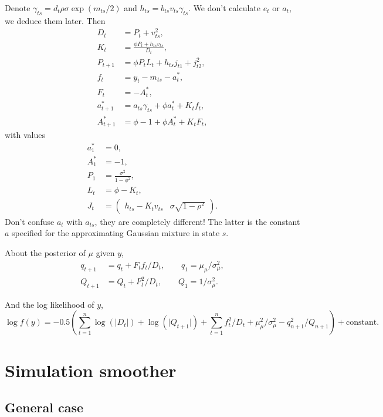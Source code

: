 \documentclass{article}
\begin{document}
Denote $\gamma_{ts}=d_t\rho\sigma\exp(m_{ts}/2)$ and $h_{ts}=b_{ts}v_{ts}\gamma_{ts}$. We don't calculate $e_t$ or $a_t$, we deduce them later. Then
\begin{align*}
D_t & = P_t+v_{ts}^2, \\
K_t & = \frac{\phi P_t+h_{ts}v_{ts}}{D_t}, \\
P_{t+1} & = \phi P_tL_t+h_{ts}j_{t1} + j_{t2}^2, \\
f_t & = y_t - m_{ts} - a_t^*, \\
F_t & = -A_t^*, \\
a_{t+1}^* & = a_{ts}\gamma_{ts}+\phi a_t^* + K_tf_t, \\
A_{t+1}^* & = \phi-1+\phi A_t^*+K_tF_t,
\end{align*}
with values
\begin{align*}
a_1^* & = 0, \\
A_1^* & = -1, \\
P_1 & = \frac{\sigma^2}{1-\phi^2}, \\
L_t & = \phi-K_t, \\
J_t & = \begin{pmatrix} h_{ts}-K_tv_{ts} & \sigma\sqrt{1-\rho^2} \end{pmatrix}.
\end{align*}
Don't confuse $a_t$ with $a_{ts}$, they are completely different! The latter is the constant $a$ specified for the approximating Gaussian mixture in state $s$.

About the posterior of $\mu$ given $y$,
\begin{align*}
q_{t+1} & = q_t+F_tf_t/D_t, \qquad q_1=\mu_\mu/\sigma_\mu^2, \\
Q_{t+1} & = Q_t+F_t^2/D_t, \qquad Q_1=1/\sigma_\mu^2.
\end{align*}

And the log likelihood of $y$,
\begin{equation*}
\log f(y) = -0.5\left(\sum_{t=1}^n\log\left(\lvert D_t\rvert\right)+\log\left(\lvert Q_{t+1}\rvert\right)+\sum_{t=1}^n f_t^2/D_t + \mu_\mu^2/\sigma_\mu^2 - q_{n+1}^2/Q_{n+1}\right) + \text{constant}.
\end{equation*}

\section{Simulation smoother}

\subsection{General case}
\end{document}
